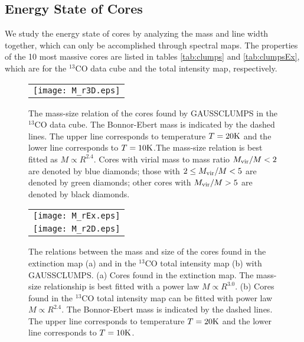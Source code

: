 \documentclass[12pt,preprint]{aastex}
\begin{document}
\subsection{Energy State of Cores}
We study the energy state of cores by analyzing the mass and line width together, which can only be accomplished through spectral maps.
The properties of the 10 most massive cores are listed in tables \ref{tab:clumps} and \ref{tab:clumpsEx},
which are for the $^{13}$CO data cube and the total intensity map, respectively.

\begin{figure}[htb]
\centering
\begin{tabular}{c}
\texttt{[image: M\_r3D.eps]}\\
\end{tabular}
\caption{ The mass-size relation of the cores found by GAUSSCLUMPS in the $^{13}$CO data cube. The Bonnor-Ebert mass is indicated by the dashed lines.
The upper line corresponds to temperature $T=20\rm K$ and the lower line corresponds to $T=10\rm K$.The mass-size relation is best fitted as $M\propto R^{2.4}$.
Cores with virial mass to mass ratio
$M_{\rm vir}/M<2$ are denoted by blue diamonds; those with $2\le M_{\rm vir}/M<5$ are denoted by green diamonds; other cores with $M_{\rm vir}/M>5$ are denoted by black diamonds.\label{mass_radius}}
\end{figure}

\begin{figure}[htb]
\centering
\begin{tabular}{c}
\texttt{[image: M\_rEx.eps]}\\
\texttt{[image: M\_r2D.eps]}\\
\end{tabular}
\caption{ The relations between the mass and size of the cores found in the extinction map (a) and in the $^{13}$CO total intensity map (b) with GAUSSCLUMPS.
(a) Cores found in the extinction map. The mass-size relationship is best fitted with a power law $M\propto R^{3.0}$.
(b) Cores found in the $^{13}$CO total intensity map can be fitted with power law $M\propto R^{2.4}$. The Bonnor-Ebert mass is indicated by the dashed lines. The upper line corresponds to temperature $T=20\rm K$ and the lower line corresponds to $T=10\rm K$.
\label{mass_radius2}}
\end{figure}
\end{document}
